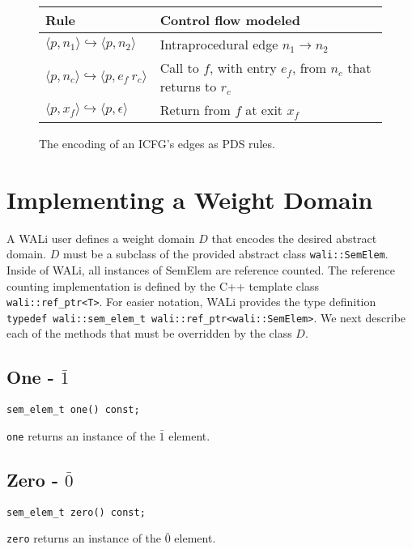 \documentclass[english,a4paper,11pt]{article}
\theoremstyle{definition}
\def\ONE{\bar{1}}
\def\ZERO{\bar{0}}
\def\eps{\epsilon}
\newcommand{\conf}[1]{\langle #1 \rangle}
\newcommand{\Rule}[2]{\conf{#1}\hookrightarrow\conf{#2}}
\begin{document}
\begin{figure}[h]
\begin{center}
\begin{tabular}{|l|l|}
  \hline
  Rule & Control flow modeled \\
  \hline \hline
  $\Rule{p,n_1}{p,n_2}$   & Intraprocedural edge $n_1 \to n_2$ \\
  $\Rule{p,n_c}{p,e_f\ r_c}$ & Call to $f$, with entry $e_f$, from $n_c$ that returns to $r_c$ \\
  $\Rule{p,x_f}{p, \eps}$  & Return from $f$ at exit $x_f$ \\
\hline
\end{tabular}
\end{center}
\caption{The encoding of an ICFG's edges as PDS rules.}
\label{Fi:icfgencoding}
\end{figure}

\section{Implementing a Weight Domain}
\label{Se:WeightDomains}
\begin{sloppypar}
A WALi user defines a weight domain $D$ that encodes the desired
abstract domain. $D$ must be a subclass of
the provided abstract class \verb!wali::SemElem!. Inside of WALi, all
instances of SemElem are reference counted. The reference counting
implementation is defined by the C++ template class \verb!wali::ref_ptr<T>!.
For easier notation, WALi provides the type definition
\verb!typedef wali::sem_elem_t wali::ref_ptr<wali::SemElem>!.
We next describe each of the methods that must be overridden by the class $D$.
\end{sloppypar}

\subsection{One - $\ONE$}
\begin{verbatim}
sem_elem_t one() const;
\end{verbatim}
\verb!one! returns an instance of the $\ONE$ element.

\subsection{Zero - $\ZERO$}
\begin{verbatim}
sem_elem_t zero() const;
\end{verbatim}
\verb!zero! returns an instance of the $\ZERO$ element.
\end{document}
